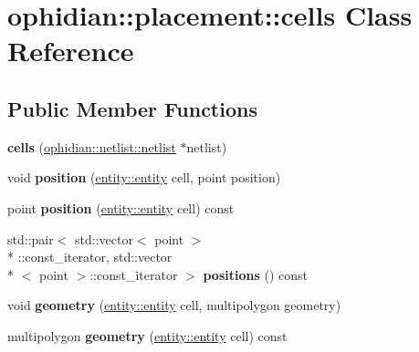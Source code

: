 \hypertarget{classophidian_1_1placement_1_1cells}{\section{ophidian\-:\-:placement\-:\-:cells Class Reference}
\label{classophidian_1_1placement_1_1cells}
}
\subsection*{Public Member Functions}
\begin{DoxyCompactItemize}
\item 
\hypertarget{classophidian_1_1placement_1_1cells_a73b759d7b27b7f984f00d75f951f6581}{{\bfseries cells} (\hyperlink{classophidian_1_1netlist_1_1netlist}{ophidian\-::netlist\-::netlist} $\ast$netlist)}\label{classophidian_1_1placement_1_1cells_a73b759d7b27b7f984f00d75f951f6581}

\item 
\hypertarget{classophidian_1_1placement_1_1cells_a702417e7bd9870b480cb7d7310fb5407}{void {\bfseries position} (\hyperlink{classophidian_1_1entity_1_1entity}{entity\-::entity} cell, point position)}\label{classophidian_1_1placement_1_1cells_a702417e7bd9870b480cb7d7310fb5407}

\item 
\hypertarget{classophidian_1_1placement_1_1cells_a97671592820009c8db77ddd4dbcac339}{point {\bfseries position} (\hyperlink{classophidian_1_1entity_1_1entity}{entity\-::entity} cell) const }\label{classophidian_1_1placement_1_1cells_a97671592820009c8db77ddd4dbcac339}

\item 
\hypertarget{classophidian_1_1placement_1_1cells_a96d09dd21b4cbcf87d2da8c2d0002d30}{std\-::pair$<$ std\-::vector$<$ point $>$\\*
\-::const\-\_\-iterator, std\-::vector\\*
$<$ point $>$\-::const\-\_\-iterator $>$ {\bfseries positions} () const }\label{classophidian_1_1placement_1_1cells_a96d09dd21b4cbcf87d2da8c2d0002d30}

\item 
\hypertarget{classophidian_1_1placement_1_1cells_ac16413d4aeae07a7d4877da1045e0e8b}{void {\bfseries geometry} (\hyperlink{classophidian_1_1entity_1_1entity}{entity\-::entity} cell, multipolygon geometry)}\label{classophidian_1_1placement_1_1cells_ac16413d4aeae07a7d4877da1045e0e8b}

\item 
\hypertarget{classophidian_1_1placement_1_1cells_ac5ca2df60550b80f58dca261811354d3}{multipolygon {\bfseries geometry} (\hyperlink{classophidian_1_1entity_1_1entity}{entity\-::entity} cell) const }\label{classophidian_1_1placement_1_1cells_ac5ca2df60550b80f58dca261811354d3}


\end{DoxyCompactItemize}
